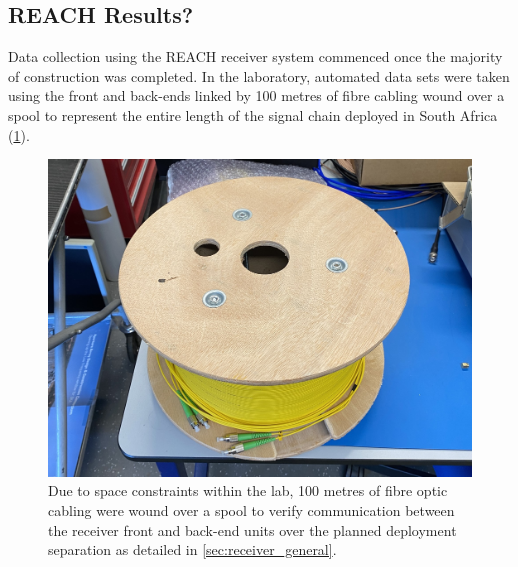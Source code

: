 \subsection{REACH Results?}\label{sec:reach_results}
Data collection using the REACH receiver system commenced once the majority of construction was completed. In the laboratory, automated data sets were taken using the front and back-ends linked by 100 metres of fibre cabling wound over a spool to represent the entire length of the signal chain deployed in South Africa (\cref{fig:fibre_spool}).
\begin{figure}
    \centering
    \includegraphics[width=.6\textwidth]{fibre_spool.jpg}
    \caption{Due to space constraints within the lab, 100 metres of fibre optic cabling were wound over a spool to verify communication between the receiver front and back-end units over the planned deployment separation as detailed in \cref{sec:receiver_general}.}
    \label{fig:fibre_spool}
\end{figure}


